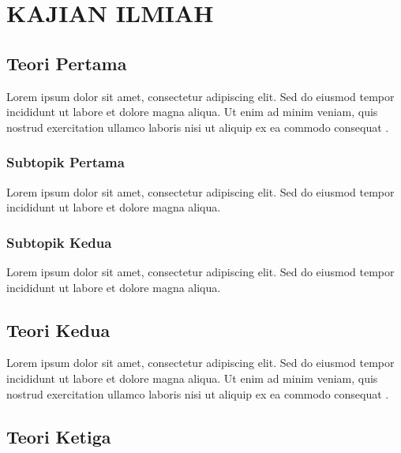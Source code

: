 \chapter{KAJIAN ILMIAH}

\section{Teori Pertama}


Lorem ipsum dolor sit amet, consectetur adipiscing elit. Sed do eiusmod tempor incididunt ut labore et dolore magna aliqua. Ut enim ad minim veniam, quis nostrud exercitation ullamco laboris nisi ut aliquip ex ea commodo consequat \citep{referensi1}.

\subsection{Subtopik Pertama}

Lorem ipsum dolor sit amet, consectetur adipiscing elit. Sed do eiusmod tempor incididunt ut labore et dolore magna aliqua.

\subsection{Subtopik Kedua}

Lorem ipsum dolor sit amet, consectetur adipiscing elit. Sed do eiusmod tempor incididunt ut labore et dolore magna aliqua.

\section{Teori Kedua}


Lorem ipsum dolor sit amet, consectetur adipiscing elit. Sed do eiusmod tempor incididunt ut labore et dolore magna aliqua. Ut enim ad minim veniam, quis nostrud exercitation ullamco laboris nisi ut aliquip ex ea commodo consequat \citep{referensi2}.

\section{Teori Ketiga}


